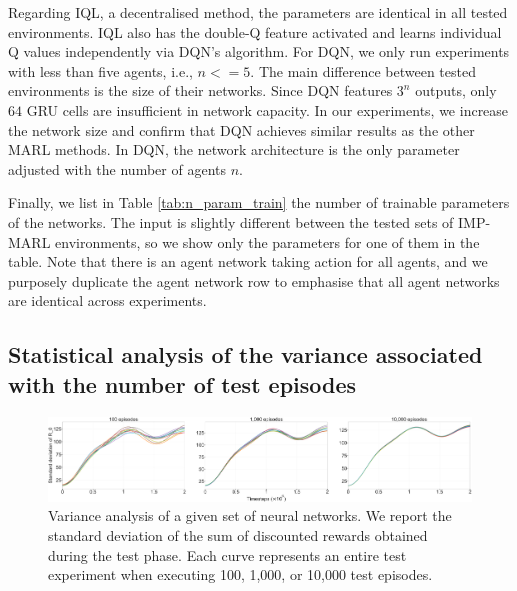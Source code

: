 Regarding IQL, a decentralised method, the parameters are identical in all tested environments.
IQL also has the double-Q feature activated and learns individual Q values independently via DQN's algorithm.
For DQN, we only run experiments with less than five agents, i.e., $n<=5$.
The main difference between tested environments is the size of their networks. 
Since DQN features $3^n$ outputs, only $64$ GRU cells are insufficient in network capacity. 
In our experiments, we increase the network size and confirm that DQN achieves similar results as the other MARL methods.
In DQN, the network architecture is the only parameter adjusted with the number of agents $n$.

Finally, we list in Table \ref{tab:n_param_train} the number of trainable parameters of the networks.
The input is slightly different between the tested sets of IMP-MARL environments, so we show only the parameters for one of them in the table.
Note that there is an agent network taking action for all agents, and we purposely duplicate the agent network row to emphasise that all agent networks are identical across experiments.

\subsection{Statistical analysis of the variance associated with the number of test episodes}
\label{sec:ch5_appendix_variance}

\begin{figure}
\centering
    \includegraphics[width=\textwidth]{tex_thesis/figures/ch5/variance_analysis.pdf}
\caption{
Variance analysis of a given set of neural networks.
We report the standard deviation of the sum of discounted rewards obtained during the test phase.
Each curve represents an entire test experiment when executing 100, 1,000, or 10,000 test episodes.
}
\label{fig:variance_details}
\end{figure}

